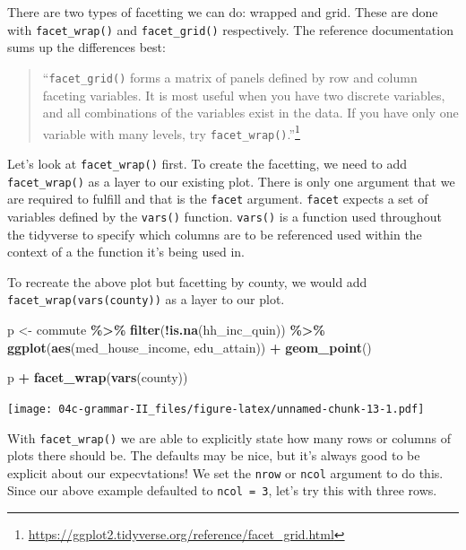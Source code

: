 \documentclass[
]{book}
\newenvironment{Shaded}{\begin{snugshade}}{\end{snugshade}}
\newcommand{\KeywordTok}[1]{\textcolor[rgb]{0.13,0.29,0.53}{\textbf{#1}}}
\newcommand{\NormalTok}[1]{#1}
\newcommand{\OperatorTok}[1]{\textcolor[rgb]{0.81,0.36,0.00}{\textbf{#1}}}
\newcommand{\StringTok}[1]{\textcolor[rgb]{0.31,0.60,0.02}{#1}}
\begin{document}
There are two types of facetting we can do: wrapped and grid. These are done with \texttt{facet\_wrap()} and \texttt{facet\_grid()} respectively. The reference documentation sums up the differences best:

\begin{quote}
``\texttt{facet\_grid()} forms a matrix of panels defined by row and column faceting variables. It is most useful when you have two discrete variables, and all combinations of the variables exist in the data. If you have only one variable with many levels, try \texttt{facet\_wrap()}.''\footnote{\url{https://ggplot2.tidyverse.org/reference/facet_grid.html}}
\end{quote}

Let's look at \texttt{facet\_wrap()} first. To create the facetting, we need to add \texttt{facet\_wrap()} as a layer to our existing plot. There is only one argument that we are required to fulfill and that is the \texttt{facet} argument. \texttt{facet} expects a set of variables defined by the \texttt{vars()} function. \texttt{vars()} is a function used throughout the tidyverse to specify which columns are to be referenced used within the context of a the function it's being used in.

To recreate the above plot but facetting by county, we would add \texttt{facet\_wrap(vars(county))} as a layer to our plot.

\begin{Shaded}
\begin{Highlighting}[]
\NormalTok{p \textless{}{-}}\StringTok{ }\NormalTok{commute }\OperatorTok{\%\textgreater{}\%}\StringTok{ }
\StringTok{  }\KeywordTok{filter}\NormalTok{(}\OperatorTok{!}\KeywordTok{is.na}\NormalTok{(hh\_inc\_quin)) }\OperatorTok{\%\textgreater{}\%}\StringTok{ }
\StringTok{  }\KeywordTok{ggplot}\NormalTok{(}\KeywordTok{aes}\NormalTok{(med\_house\_income, edu\_attain)) }\OperatorTok{+}
\StringTok{  }\KeywordTok{geom\_point}\NormalTok{() }

\NormalTok{p }\OperatorTok{+}
\StringTok{  }\KeywordTok{facet\_wrap}\NormalTok{(}\KeywordTok{vars}\NormalTok{(county))}
\end{Highlighting}
\end{Shaded}

\texttt{[image: 04c-grammar-II\_files/figure-latex/unnamed-chunk-13-1.pdf]}

With \texttt{facet\_wrap()} we are able to explicitly state how many rows or columns of plots there should be. The defaults may be nice, but it's always good to be explicit about our expecvtations! We set the \texttt{nrow} or \texttt{ncol} argument to do this. Since our above example defaulted to \texttt{ncol\ =\ 3}, let's try this with three rows.
\end{document}
